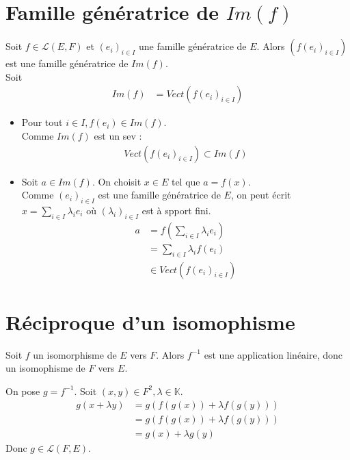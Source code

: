 \documentclass[../main.tex]{subfiles}
\begin{document}
\section{Famille génératrice de $Im(f)$}
\begin{tcolorbox}[title=Propostion 21.21, title filled=false, colframe=lightblue, colback=lightblue!10!white]
    Soit $f\in \mathcal{L}(E, F)$ et $(e_i)_{i \in I}$ une famille génératrice de $E$. Alors $(f(e_i)_{i \in I})$ est une famille génératrice de $Im(f)$. \\
    Soit 
    \begin{align*}
        Im(f) &= Vect(f(e_i)_{i \in I})
    \end{align*}
\end{tcolorbox}

\begin{itemize}
    \item Pour tout $i \in I, f(e_i) \in Im(f)$. \\
    Comme $Im(f)$ est un sev : 
    \begin{align*}
        Vect(f(e_i)_{i \in I}) \subset Im(f)
    \end{align*}

    \item Soit $a\in Im(f)$. On choisit $x\in E$ tel que $a = f(x)$. \\
    Comme $(e_i)_{i \in I}$ est une famille génératrice de $E$, on peut écrit $x = \sum\limits_{i\in I} \lambda_i e_i$ où $(\lambda_i)_{i\in I}$ est à spport fini. 
    \begin{align*}
        a &= f\left(\sum_{i\in I} \lambda_i e_i\right) \\
        &= \sum_{i\in I} \lambda_i f(e_i) \\
        &\in Vect(f(e_i)_{i \in I})
    \end{align*}
\end{itemize}

\section{Réciproque d'un isomophisme}
\begin{tcolorbox}[title=Théorème 12.23, title filled=false, colframe=orange, colback=orange!10!white]
    Soit $f$ un isomorphisme de $E$ vers $F$. Alors $f^{-1}$ est une application linéaire, donc un isomophisme de $F$ vers $E$. 
\end{tcolorbox}

\noindent On pose $g = f^{-1}$. Soit $(x, y) \in F^2, \lambda \in \mathbb{K}$. 
\begin{align*}
    g(x + \lambda y) &= g(f(g(x)) + \lambda f(g(y))) \\
    &= g(f(g(x)) + \lambda f(g(y))) \\
    &= g(x) + \lambda g(y)
\end{align*}
Donc $g \in \mathcal{L}(F, E)$.
\end{document}
